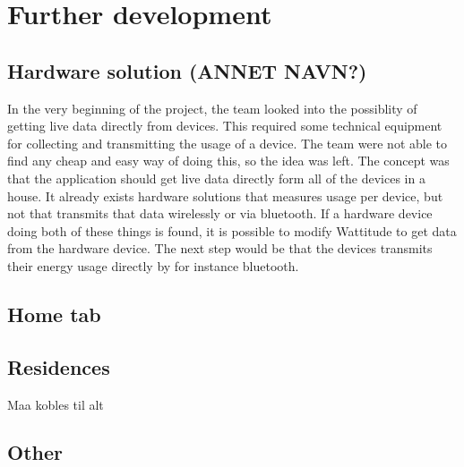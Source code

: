 \chapter{Further development}
\label{sec:further}
\section{Hardware solution (ANNET NAVN?)}
In the very beginning of the project, the team looked into the possiblity of getting live data directly from devices. This required some technical equipment for collecting and transmitting the usage of a device. The team were not able to find any cheap and easy way of doing this, so the idea was left. The concept was that the application should get live data directly form all of the devices in a house. It already exists hardware solutions that measures usage per device, but not that transmits that data wirelessly or via bluetooth. If a hardware device doing both of these things is found, it is possible to modify Wattitude to get data from the hardware device. The next step would be that the devices transmits their energy usage directly by for instance bluetooth. 

\section{Home tab}

\section{Residences}
Maa kobles til alt

\section{Other}